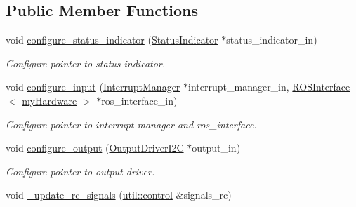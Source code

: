 \subsection*{Public Member Functions}
\begin{DoxyCompactItemize}
\item 
void \hyperlink{classSPMB_1_1StateMachine_aea3379ddeb8edf85d0350c3e6391391a}{configure\+\_\+status\+\_\+indicator} (\hyperlink{classSPMB_1_1StatusIndicator}{Status\+Indicator} $\ast$status\+\_\+indicator\+\_\+in)\hypertarget{classSPMB_1_1StateMachine_aea3379ddeb8edf85d0350c3e6391391a}{}\label{classSPMB_1_1StateMachine_aea3379ddeb8edf85d0350c3e6391391a}

\begin{DoxyCompactList}\small\item\em Configure pointer to status indicator. \end{DoxyCompactList}\item 
void \hyperlink{classSPMB_1_1StateMachine_a435a2eb92508aa038a0df64b4edd3ff2}{configure\+\_\+input} (\hyperlink{classSPMB_1_1InterruptManager}{Interrupt\+Manager} $\ast$interrupt\+\_\+manager\+\_\+in, \hyperlink{classSPMB_1_1ROSInterface}{R\+O\+S\+Interface}$<$ \hyperlink{namespaceSPMB_a3dfee893976eb910fb3de34c228c2314}{my\+Hardware} $>$ $\ast$ros\+\_\+interface\+\_\+in)\hypertarget{classSPMB_1_1StateMachine_a435a2eb92508aa038a0df64b4edd3ff2}{}\label{classSPMB_1_1StateMachine_a435a2eb92508aa038a0df64b4edd3ff2}

\begin{DoxyCompactList}\small\item\em Configure pointer to interrupt manager and ros\+\_\+interface. \end{DoxyCompactList}\item 
void \hyperlink{classSPMB_1_1StateMachine_a1e1f84c67c0db8422a17c6d0f76f70a8}{configure\+\_\+output} (\hyperlink{classSPMB_1_1OutputDriverI2C}{Output\+Driver\+I2C} $\ast$output\+\_\+in)\hypertarget{classSPMB_1_1StateMachine_a1e1f84c67c0db8422a17c6d0f76f70a8}{}\label{classSPMB_1_1StateMachine_a1e1f84c67c0db8422a17c6d0f76f70a8}

\begin{DoxyCompactList}\small\item\em Configure pointer to output driver. \end{DoxyCompactList}\item 
void \hyperlink{classSPMB_1_1StateMachine_af1812d19f20f020a1635a96da3e8e048}{\+\_\+update\+\_\+rc\+\_\+signals} (\hyperlink{structSPMB_1_1util_1_1control}{util\+::control} \&signals\+\_\+rc)\hypertarget{classSPMB_1_1StateMachine_af1812d19f20f020a1635a96da3e8e048}{}\label{classSPMB_1_1StateMachine_af1812d19f20f020a1635a96da3e8e048}


\end{DoxyCompactItemize}
